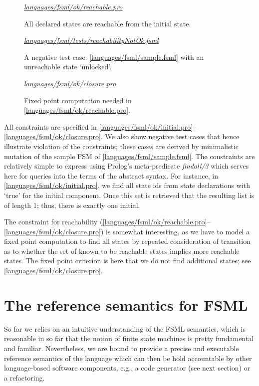 \documentclass[preprint,authoryear,12pt]{noelsarticle}
\newcommand{\codefigure}[3]{
\begin{figure}[t!]
\begin{boxedminipage}{\hsize}
\mbox{}\hfill{}{\small\textit{\href{http://github.com/slebok/slepro/tree/master/#2}{#2}}}

\end{boxedminipage}
\caption{#1.}
\label{#2}
\medskip
\end{figure}}
\begin{document}
\codefigure{%
All declared states are reachable from the initial state}{%
languages/fsml/ok/reachable.pro}{%
prolog}

\codefigure{%
A negative test case: \autoref{languages/fsml/sample.fsml} with an
unreachable state `unlocked'}{%
languages/fsml/tests/reachabilityNotOk.fsml}{%
fsml}

\codefigure{%
Fixed point computation needed in \autoref{languages/fsml/ok/reachable.pro}}{%
languages/fsml/ok/closure.pro}{%
prolog}

All constraints are specified in
\autoref{languages/fsml/ok/initial.pro}--\autoref{languages/fsml/ok/closure.pro}.
We also show negative test cases that hence illustrate violation of
the constraints; these cases are derived by minimalistic mutation of
the sample FSM of \autoref{languages/fsml/sample.fsml}. The
constraints are relatively simple to express using Prolog's
meta-predicate \emph{findall/3} which serves here for queries into the
terms of the abstract syntax. For instance, in
\autoref{languages/fsml/ok/initial.pro}, we find all state ids from
state declarations with `true' for the initial component. Once this
set is retrieved that the resulting list is of length 1; thus, there
is exactly one initial.

The constraint for reachability
(\autoref{languages/fsml/ok/reachable.pro}--\autoref{languages/fsml/ok/closure.pro})
is somewhat interesting, as we have to model a fixed point computation
to find all states by repeated consideration of transition as to
whether the set of known to be reachable states implies more reachable
states. The fixed point criterion is here that we do not find
additional states; see \autoref{languages/fsml/ok/closure.pro}.


\section{The reference semantics for FSML}
\label{S:semantics}

So far we relies on an intuitive understanding of the FSML semantics,
which is reasonable in so far that the notion of finite state machines
is pretty fundamental and familiar. Nevertheless, we are bound to
provide a precise and executable reference semantics of the language
which can then be hold accountable by other language-based software
components, e.g., a code generator (see next section) or a
refactoring. 
\end{document}
